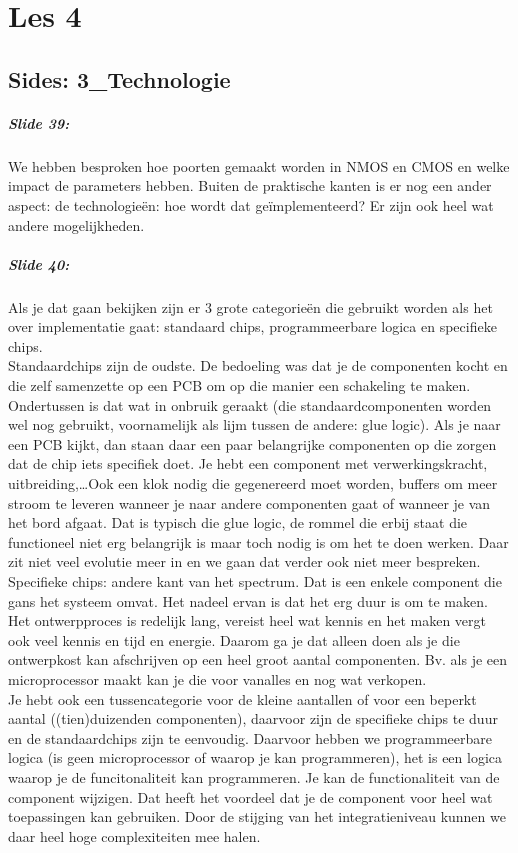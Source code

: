 \documentclass[10pt,a4paper]{book}
\begin{document}
\chapter{Les 4}
\section{Sides: 3\_Technologie}

\paragraph{Slide 39:} We hebben besproken hoe poorten gemaakt worden in NMOS en CMOS en welke impact de parameters hebben. Buiten de praktische kanten is er nog een ander aspect: de technologie\"en: hoe wordt dat ge\"implementeerd? Er zijn ook heel wat andere mogelijkheden.

\paragraph{Slide 40:} Als je dat gaan bekijken zijn er 3 grote categorie\"en die gebruikt worden als het over implementatie gaat: standaard chips, programmeerbare logica en specifieke chips.\\
Standaardchips zijn de oudste. De bedoeling was dat je de componenten kocht en die zelf samenzette op een PCB om op die manier een schakeling te maken. Ondertussen is dat wat in onbruik geraakt (die standaardcomponenten worden wel nog gebruikt, voornamelijk als lijm tussen de andere: glue logic). Als je naar een PCB kijkt, dan staan daar een paar belangrijke componenten op die zorgen dat de chip iets specifiek doet. Je hebt een component met verwerkingskracht, uitbreiding,\ldots Ook een klok nodig die gegenereerd moet worden, buffers om meer stroom te leveren wanneer je naar andere componenten gaat of wanneer je van het bord afgaat. Dat is typisch die glue logic, de rommel die erbij staat die functioneel niet erg belangrijk is maar toch nodig is om het te doen werken. Daar zit niet veel evolutie meer in en we gaan dat verder ook niet meer bespreken.\\
Specifieke chips: andere kant van het spectrum. Dat is een enkele component die gans het systeem omvat. Het nadeel ervan is dat het erg duur is om te maken. Het ontwerpproces is redelijk lang, vereist heel wat kennis en het maken vergt ook veel kennis en tijd en energie. Daarom ga je dat alleen doen als je die ontwerpkost kan afschrijven op een heel groot aantal componenten. Bv. als je een microprocessor maakt kan je die voor vanalles en nog wat verkopen. \\
Je hebt ook een tussencategorie voor de kleine aantallen of voor een beperkt aantal ((tien)duizenden componenten), daarvoor zijn de specifieke chips te duur en de standaardchips zijn te eenvoudig. Daarvoor hebben we programmeerbare logica (is geen microprocessor of waarop je kan programmeren), het is een logica waarop je de funcitonaliteit kan programmeren. Je kan de functionaliteit van de component wijzigen. Dat heeft het voordeel dat je de component voor heel wat toepassingen kan gebruiken. Door de stijging van het integratieniveau kunnen we daar heel hoge complexiteiten mee halen.
\end{document}
